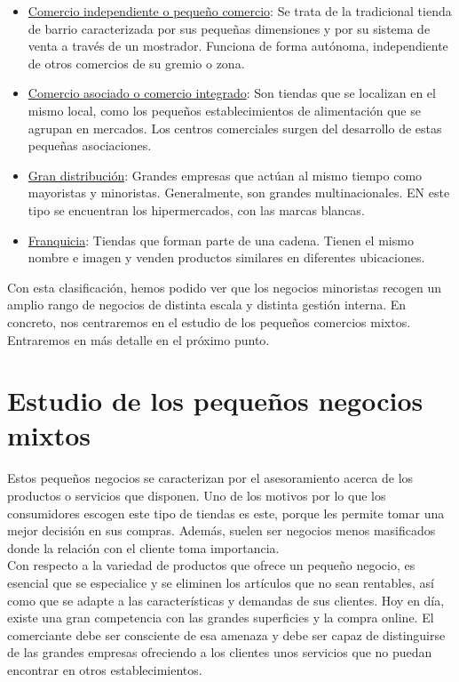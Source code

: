 \begin{itemize}
\item \underline{Comercio independiente o pequeño comercio}: Se trata de la tradicional tienda de barrio caracterizada por sus pequeñas dimensiones y por su sistema de venta a través de un mostrador. Funciona de forma autónoma, independiente de otros comercios de su gremio o zona. 
\item \underline{Comercio asociado o comercio integrado}: Son tiendas que se localizan en el mismo local, como los pequeños establecimientos de alimentación que se agrupan en mercados. Los centros comerciales surgen del desarrollo de estas pequeñas asociaciones. 
\item \underline{Gran distribución}: Grandes empresas que actúan al mismo tiempo como mayoristas y minoristas. Generalmente, son grandes multinacionales. EN este tipo se encuentran los hipermercados, con las marcas blancas.
\item \underline{Franquicia}: Tiendas que forman parte de una cadena. Tienen el mismo nombre e imagen y venden productos similares en diferentes ubicaciones. 
\end{itemize}


Con esta clasificación, hemos podido ver que los negocios minoristas recogen un amplio rango de negocios de distinta escala y distinta gestión interna. En concreto, nos centraremos en el estudio de los pequeños comercios mixtos. Entraremos en más detalle en el próximo punto. 

\newpage

\section{Estudio de los pequeños negocios mixtos}

Estos pequeños negocios se caracterizan por el asesoramiento acerca de los productos o servicios que disponen. Uno de los motivos por lo que los consumidores escogen este tipo de tiendas es este, porque les permite tomar una mejor decisión en sus compras. Además, suelen ser negocios menos masificados donde la relación con el cliente toma importancia. \cite{gestionNegocio} \\

Con respecto a la variedad de productos que ofrece un pequeño negocio, es esencial que se especialice y se eliminen los artículos que no sean rentables, así como que se adapte a las características y demandas de sus clientes. Hoy en día, existe una gran competencia con las grandes superficies y la compra online. El comerciante debe ser consciente de esa amenaza y debe ser capaz de distinguirse de las grandes empresas ofreciendo a los clientes unos servicios que no puedan encontrar en otros establecimientos. \\

